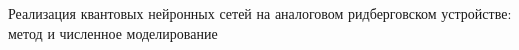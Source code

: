 Реализация квантовых нейронных сетей на аналоговом ридберговском устройстве: метод и численное моделирование
